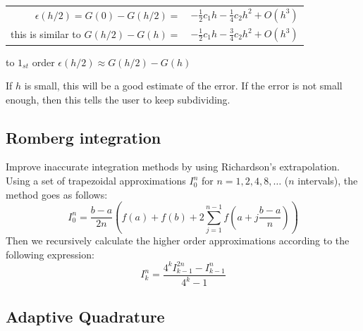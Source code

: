 \documentclass[8pt,a4paper]{scrartcl}
\begin{document}
\begin{multicols*}{3}
\finn

\begin{tabular}{rl}
$\epsilon(h/2)=G(0)-G(h/2)=$&$-\frac{1}{2}c_1h-\frac{1}{4}c_2h^2+O(h^3)$\\
this is similar to $G(h/2)-G(h)=$&$-\frac{1}{2}c_1h-\frac{3}{4}c_2h^2+O(h^3)$
\end{tabular}

\dahe to $1_{st}$ order $\epsilon(h/2)\approx G(h/2)-G(h)$

\finn

If $h$ is small, this will be a good estimate of the error. If the error is not small enough, then this tells the user to keep subdividing.

\subsection{Romberg integration}

Improve inaccurate integration methods by using Richardson's extrapolation. Using a set of trapezoidal approximations $I_0^n$ for $n = 1,2,4,8,\dots$ ($n$ intervals), the method goes as follows:
\begin{equation*}
I_0^n = \frac{b-a}{2n} \left( f(a) + f(b) + 2 \sum_{j=1}^{n-1} f\left(a+j \frac{b-a}{n}\right) \right)
\end{equation*}
Then we recursively calculate the higher order approximations according to the following expression:
\begin{equation*}
I_k^n = \frac{4^k I_{k-1}^{2n} - I_{k-1}^n}{4^k - 1}
\end{equation*}


\subsection{Adaptive Quadrature}


\end{multicols*}
\end{document}
